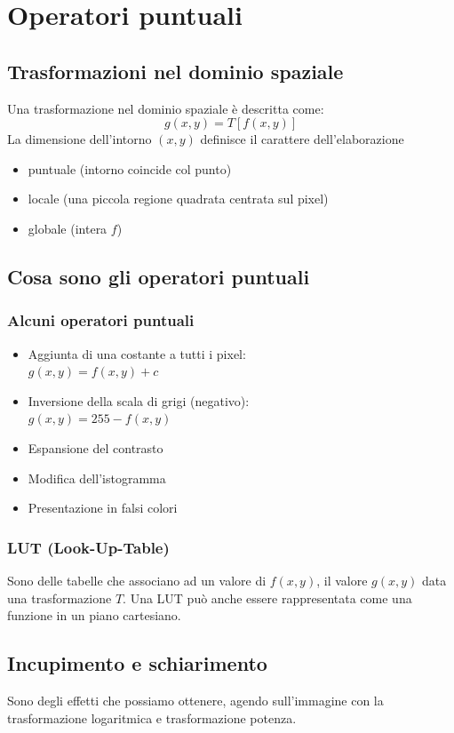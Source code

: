 \documentclass{report}
\begin{document}
	\chapter{Operatori puntuali}
	\section{Trasformazioni nel dominio spaziale}
	Una trasformazione nel dominio spaziale è descritta come:
	$$
	g(x,y) = T[f(x,y)]
	$$
	La dimensione dell'intorno $(x,y)$ definisce il carattere dell'elaborazione
	\begin{itemize}
		\item puntuale (intorno coincide col punto)
		\item locale (una piccola regione quadrata centrata sul pixel)
		\item globale (intera $f$)
	\end{itemize}
	\section{Cosa sono gli operatori puntuali}
	\subsection{Alcuni operatori puntuali}
	\begin{itemize}
		\item Aggiunta di una costante a tutti i pixel:\\
		      $g(x,y) = f(x,y) + c$
		\item Inversione della scala di grigi (negativo):\\
		      $g(x,y) = 255 - f(x,y)$
		\item Espansione del contrasto
		\item Modifica dell'istogramma
		\item Presentazione in falsi colori
		      \newpage
	\end{itemize}
	\subsection{LUT (Look-Up-Table)}
	Sono delle tabelle che associano ad un valore di $f(x,y)$, il valore $g(x,y)$ data una trasformazione $T$. Una LUT può anche essere rappresentata come una funzione in un piano cartesiano.
		
	\section{Incupimento e schiarimento}
	Sono degli effetti che possiamo ottenere, agendo sull'immagine con la trasformazione logaritmica e trasformazione potenza.
\end{document}
